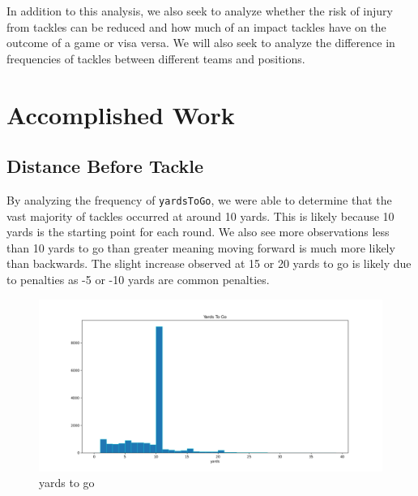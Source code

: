 \documentclass[bibtex, sigconf, hyperref={colorlinks=true,linkcolor=blue,urlcolor=blue}]{acmart}
\begin{document}

In addition to this analysis, we also seek to analyze whether the risk of injury
from tackles can be reduced and how much of an impact tackles have on the
outcome of a game or visa versa. We will also seek to analyze the difference in
frequencies of tackles between different teams and positions.

\section{Accomplished Work}
\subsection{Distance Before Tackle}
By analyzing the frequency of \verb|yardsToGo|, we were able to determine that
the vast majority of tackles occurred at around 10 yards. This is likely because
10 yards is the starting point for each round. We also see more observations
less than 10 yards to go than greater meaning moving forward is much more likely than backwards.
The slight increase observed at 15 or 20 yards to go is likely due to penalties as -5 or -10 yards are common penalties.

\begin{figure}[h]
  \centering
  \includegraphics[width=\linewidth]{../src/yards.png}
  \caption{yards to go}
\end{figure}
\end{document}
